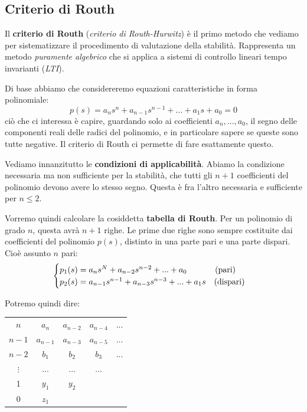 \documentclass[a4paper,11pt]{article}
\begin{document}
\subsection{Criterio di Routh}
Il \textbf{criterio di Routh} (\textit{criterio di Routh-Hurwitz}) è il primo metodo che vediamo per sistematizzare il procedimento di valutazione della stabilità.
Rappresenta un metodo \textit{puramente algebrico} che si applica a sistemi di controllo lineari tempo invarianti (\textit{LTI}).

Di base abbiamo che considereremo equazioni caratteristiche in forma polinomiale:
$$
p(s) = a_n s^n + a_{n - 1}s^{n - 1} + ... + a_1 s + a_0 = 0
$$
ciò che ci interessa è capire, guardando solo ai coefficienti $a_n, ..., a_0$, il segno delle componenti reali delle radici del polinomio, e in particolare sapere se queste sono tutte negative.
Il criterio di Routh ci permette di fare esattamente questo.

Vediamo innanzitutto le \textbf{condizioni di applicabilità}.
Abiamo la condizione necessaria ma non sufficiente per la stabilità, che tutti gli $n + 1$ coefficienti del polinomio devono avere lo stesso segno.
Questa è fra l'altro necessaria e sufficiente per $n \leq 2$.

Vorremo quindi calcolare la cosiddetta \textbf{tabella di Routh}.
Per un polinomio di grado $n$, questa avrà $n + 1$ righe.
Le prime due righe sono sempre costituite dai coefficienti del polinomio $p(s)$, distinto in una parte pari e una parte dispari.
Cioè assunto $n$ pari:
\[
	\begin{cases}
		p_1(s) = a_n s^N + a_{n - 2} s^{n - 2} + ... + a_0 \quad \hspace{0.85cm} \text{(pari)} \\
		p_2(s) = a_{n - 1} s^{n - 1} + a_{n - 3} s^{n - 3} + ... + a_1 s \quad \text{(dispari)}
	\end{cases}
\]

Potremo quindi dire:
\begin{table}[h!]
	\center 
	\begin{tabular} { c | c c c c }
		$n$ & $a_n$ & $a_{n - 2}$ & $a_{n - 4}$ & ... \\
		$n - 1$ & $a_{n - 1}$ & $a_{n - 3}$ & $a_{n - 5}$ & ... \\
		$n - 2$ & $b_1$ & $b_2$ & $b_3$ & ... \\
		$\vdots$ & ... & ... & ... \\
		1 & $y_1$ & $y_2$ \\
		0 & $z_1$
	\end{tabular}
\end{table}
\end{document}
